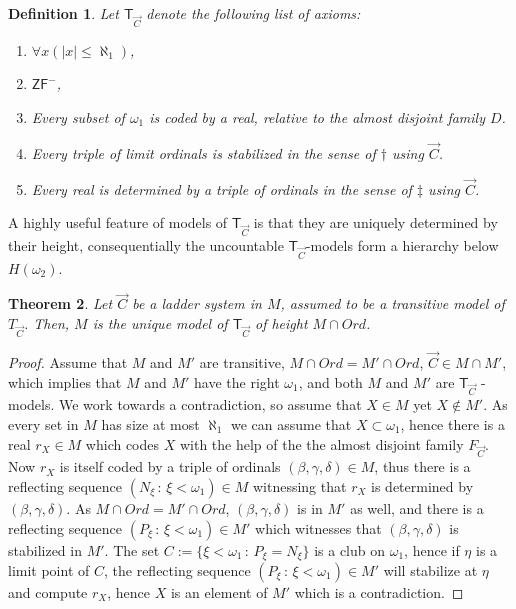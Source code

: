 \documentclass[a4paper,12pt]{article}
\newtheorem{theorem}{Theorem}[section]
\newtheorem{definition}[theorem]{Definition}
\newcommand{\ZFP}{\mathsf{ZF}^-}
\newcommand{\T}{\mathsf{T}}
\begin{document}
\begin{definition} Let $\T_{\vec{C}}$ denote the following list of axioms:
\begin{enumerate}
\item $\forall x (|x| \le \aleph_1)$,
\item $\ZFP$,
\item Every subset of $\omega_1$ is coded by a real, relative to the almost disjoint family $D$.
\item Every triple of limit ordinals is stabilized in the sense of $\dagger$ using $\vec{C}$.
\item Every real is determined by a triple of ordinals in the sense of $\ddagger$ using $\vec{C}$.
\end{enumerate}
\end{definition}
A highly useful feature of models of $\T_{\vec{C}}$ is that they are uniquely determined by their height, consequentially the uncountable $\T_{\vec{C}}$-models form a hierarchy below $H(\omega_2)$.
\begin{theorem}
Let $\vec{C}$ be a ladder system in $M$, assumed to be a transitive model of $T_{\vec{C}}$.
Then, $M$ is the unique model of $\T_{\vec{C}}$ of height $M \cap Ord$.
\end{theorem}
\begin{proof}
Assume that $M$ and $M'$ are transitive, $M \cap Ord = M' \cap Ord$, $\vec{C} \in M \cap M'$, which implies that $M$ and $M'$ have the right $\omega_1$, and both $M$ and $M'$ are $\T_{\vec{C}}$ -models.  We work towards a contradiction, so assume that  $X \in M$ yet $X \notin M'$. As every set in $M$ has size at most $\aleph_1$ we can assume that $X \subset \omega_1$, hence there is a real $r_X \in M$ which codes $X$ with the help of the the almost disjoint family $F_{\vec{C}}$. Now $r_X$ is itself coded by a triple of ordinals $(\beta, \gamma, \delta) \in M$, thus there is a reflecting sequence $(N_{\xi} \, : \, \xi < \omega_1) \in M$ witnessing that $r_X$ is determined by $(\beta, \gamma, \delta)$. As $M \cap Ord = M' \cap Ord$, $(\beta, \gamma, \delta)$ is in $M'$ as well, and there is a reflecting sequence $(P_{\xi} \, : \, \xi < \omega_1) \in M'$ which witnesses that $(\beta, \gamma, \delta)$ is stabilized in $M'$. The set $C:= \{ \xi < \omega_1 \, : \, P_{\xi} = N_{\xi} \}$ is a club on $\omega_1$, hence if $\eta$ is a limit point of $C$, the reflecting sequence $(P_{\xi} \, : \, \xi < \omega_1) \in M'$ will stabilize at $\eta$ and compute $r_X$, hence $X$ is an element of $M'$ which is a contradiction.
\end{proof}
\end{document}
